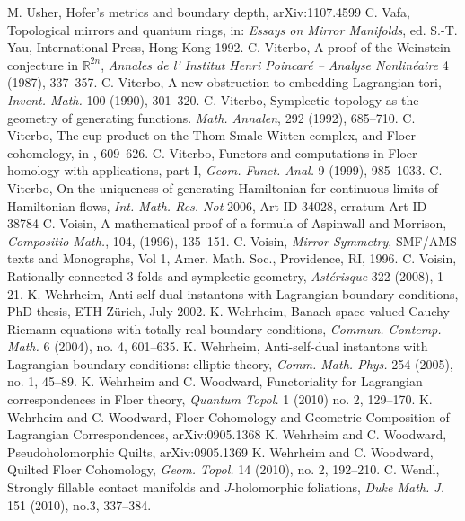  M. Usher, Hofer’s metrics and boundary depth, arXiv:1107.4599
 C. Vafa, Topological mirrors and quantum rings, in: \emph{Essays on Mirror Manifolds}, ed. S.-T. Yau, International Press, Hong Kong 1992.
 C. Viterbo, A proof of the Weinstein conjecture in $\mathbb R^{2n}$, \emph{Annales de l’ Institut Henri Poincaré -- Analyse Nonlinéaire} 4 (1987), 337--357.
 C. Viterbo, A new obstruction to embedding Lagrangian tori, \emph{Invent. Math.} 100 (1990), 301--320.
 C. Viterbo, Symplectic topology as the geometry of generating functions. \emph{Math. Annalen}, 292 (1992), 685--710.
 C. Viterbo, The cup-product on the Thom-Smale-Witten complex, and Floer cohomology, in \cite{src-181}, 609--626.
 C. Viterbo, Functors and computations in Floer homology with applications, part I, \emph{Geom. Funct. Anal.} 9 (1999), 985--1033.
 C. Viterbo, On the uniqueness of generating Hamiltonian for continuous limits of Hamiltonian flows, \emph{Int. Math. Res. Not} 2006, Art ID 34028, erratum Art ID 38784
 C. Voisin, A mathematical proof of a formula of Aspinwall and Morrison, \emph{Compositio Math.}, 104, (1996), 135--151.
 C. Voisin, \emph{Mirror Symmetry}, SMF/AMS texts and Monographs, Vol 1, Amer. Math. Soc., Providence, RI, 1996.
 C. Voisin, Rationally connected 3-folds and symplectic geometry, \emph{Astérisque} 322 (2008), 1--21.
 K. Wehrheim, Anti-self-dual instantons with Lagrangian boundary conditions, PhD thesis, ETH-Zürich, July 2002.
 K. Wehrheim, Banach space valued Cauchy--Riemann equations with totally real boundary conditions, \emph{Commun. Contemp. Math.} 6 (2004), no. 4, 601--635.
 K. Wehrheim, Anti-self-dual instantons with Lagrangian boundary conditions: elliptic theory, \emph{Comm. Math. Phys.} 254 (2005), no. 1, 45--89.
 K. Wehrheim and C. Woodward, Functoriality for Lagrangian correspondences in Floer theory, \emph{Quantum Topol.} 1 (2010) no. 2, 129--170.
 K. Wehrheim and C. Woodward, Floer Cohomology and Geometric Composition of Lagrangian Correspondences, arXiv:0905.1368
 K. Wehrheim and C. Woodward, Pseudoholomorphic Quilts, arXiv:0905.1369
 K. Wehrheim and C. Woodward, Quilted Floer Cohomology, \emph{Geom. Topol.} 14 (2010), no. 2, 192--210.
 C. Wendl, Strongly fillable contact manifolds and $J$-holomorphic foliations, \emph{Duke Math. J.} 151 (2010), no.3, 337--384.
